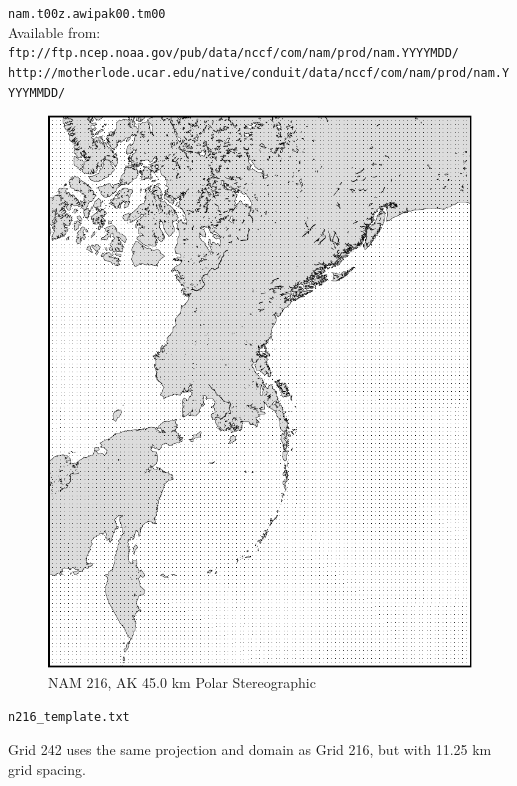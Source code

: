 \documentclass[11pt]{article}   %
\begin{document}
\verb|nam.t00z.awipak00.tm00|\\
Available from:\\
\verb|ftp://ftp.ncep.noaa.gov/pub/data/nccf/com/nam/prod/nam.YYYYMDD/| \\
\verb|http://motherlode.ucar.edu/native/conduit/data/nccf/com/nam/prod/nam.YYYYMMDD/|\\

\begin{figure}[htbp]\begin{center}
 \includegraphics[angle=-90,scale=1.0]{Figs/n216.pdf}
\parbox{15cm}{\caption{\label{FigNAM2116}
NAM 216, AK 45.0 km Polar Stereographic
}}
\end{center}\end{figure}
\clearpage 
\verb|n216_template.txt| \\
\tiny  \normalsize


\clearpage
Grid 242 uses the same projection and domain as Grid 216, but with 11.25 km
grid spacing.
\end{document}
